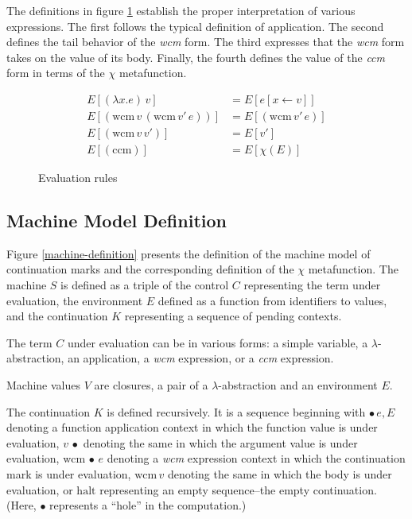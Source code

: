 \documentclass[ms]{byuprop}
\newcounter{definition}
\begin{document}
The definitions in figure \ref{language-semantics} establish the proper interpretation of various expressions. The first follows the typical definition of application. The second defines the tail behavior of the \emph{wcm} form. The third expresses that the \emph{wcm} form takes on the value of its body. Finally, the fourth defines the value of the \emph{ccm} form in terms of the $\chi$ metafunction.

\begin{figure}
\begin{align*}
E[(\lambda x.e)\,v]                         &= E[e[x\leftarrow v]]\\
E[(\mathrm{wcm}\,v\,(\mathrm{wcm}\,v'\,e))] &= E[(\mathrm{wcm}\,v'\,e)]\\
E[(\mathrm{wcm}\,v\,v')]                    &= E[v']\\
E[(\mathrm{ccm})]                           &= E[\chi(E)]
\end{align*}
\caption{Evaluation rules}
\label{language-semantics}
\end{figure}

\subsection{Machine Model Definition}

Figure \ref{machine-definition} presents the definition of the machine model of continuation 
marks and the corresponding definition of the $\chi$ metafunction. The machine $S$ is defined 
as a triple of the control $C$ representing the term under evaluation, the environment $E$ 
defined as a function from identifiers to values, and the continuation $K$ representing a 
sequence of pending contexts.

The term $C$ under evaluation can be in various forms: a simple variable, a $\lambda$-abstraction, 
an application, a \emph{wcm} expression, or a \emph{ccm} expression.

Machine values $V$ are closures, a pair of a $\lambda$-abstraction and an environment $E$.

The continuation $K$ is defined recursively. It is a sequence beginning with $\bullet\,e,E$ 
denoting a function application context in which the function value is under evaluation, 
$v\,\bullet$ denoting the same in which the argument value is under evaluation, $\mathrm{wcm}\,
\bullet\,e$ denoting a \emph{wcm} expression context in which the continuation mark is under 
evaluation, $\mathrm{wcm}\,v$ denoting the same in which the body is under evaluation, or 
$\mathrm{halt}$ representing an empty sequence--the empty continuation. (Here, $\bullet$ 
represents a ``hole'' in the computation.) 
\end{document}
